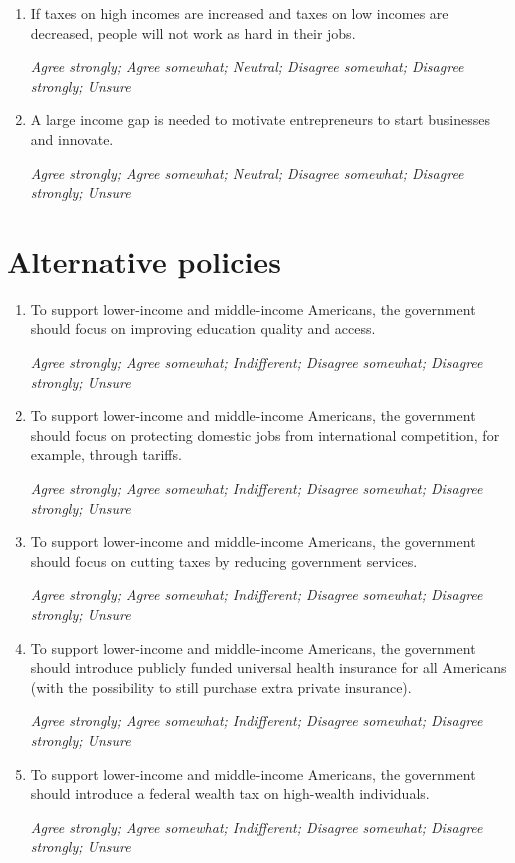 \documentclass[11pt, headsepline]{article}
\begin{document}
\begin{enumerate}[resume]
    \item If taxes on high incomes are increased and taxes on low incomes are decreased, people will not work as hard in their jobs.

    \textit{Agree strongly; Agree somewhat; Neutral; Disagree somewhat; Disagree strongly; Unsure}

    \item A large income gap is needed to motivate entrepreneurs to start businesses and innovate.

    \textit{Agree strongly; Agree somewhat; Neutral; Disagree somewhat; Disagree strongly; Unsure}
    
\end{enumerate}

\section*{Alternative policies}

\begin{enumerate}[resume]
    \item To support lower-income and middle-income Americans, the government should focus on improving education quality and access.

    \textit{Agree strongly; Agree somewhat; Indifferent; Disagree somewhat; Disagree strongly; Unsure}

    \item To support lower-income and middle-income Americans, the government should focus on protecting domestic jobs from international competition, for example, through tariffs.

    \textit{Agree strongly; Agree somewhat; Indifferent; Disagree somewhat; Disagree strongly; Unsure}

    \item To support lower-income and middle-income Americans, the government should focus on cutting taxes by reducing government services.

    \textit{Agree strongly; Agree somewhat; Indifferent; Disagree somewhat; Disagree strongly; Unsure}

    \item To support lower-income and middle-income Americans, the government should introduce publicly funded universal health insurance for all Americans (with the possibility to still purchase extra private insurance).

    \textit{Agree strongly; Agree somewhat; Indifferent; Disagree somewhat; Disagree strongly; Unsure}

    \item To support lower-income and middle-income Americans, the government should introduce a federal wealth tax on high-wealth individuals.

    \textit{Agree strongly; Agree somewhat; Indifferent; Disagree somewhat; Disagree strongly; Unsure}
    
\end{enumerate}
\end{document}

